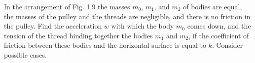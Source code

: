 
\item In the arrangement of Fig. 1.9 the masses \( m_0 \), \( m_1 \), and \( m_2 \) of bodies are equal, the masses of the pulley and the threads are negligible, and there is no friction in the pulley. Find the acceleration \( w \) with which the body \( m_0 \) comes down, and the tension of the thread binding together the bodies \( m_1 \) and \( m_2 \), if the coefficient of friction between these bodies and the horizontal surface is equal to \( k \). Consider possible cases.
    \begin{center}
    \end{center}
